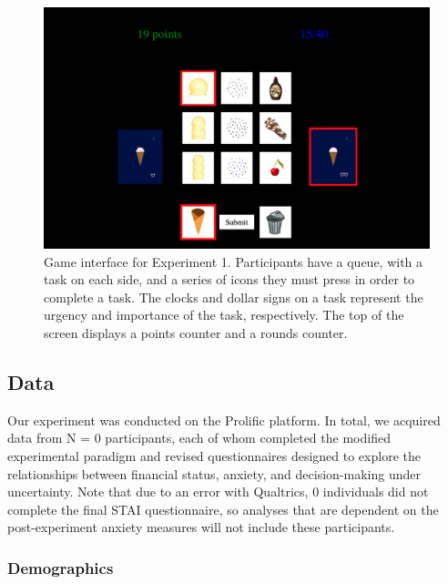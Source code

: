 \documentclass[
]{article}
\begin{document}
\begin{figure}

{\centering \includegraphics{images/exp_example.png}

}

\caption{\label{fig-exp}Game interface for Experiment 1. Participants
have a queue, with a task on each side, and a series of icons they must
press in order to complete a task. The clocks and dollar signs on a task
represent the urgency and importance of the task, respectively. The top
of the screen displays a points counter and a rounds counter.}

\end{figure}

\hypertarget{data-1}{%
\subsection{Data}\label{data-1}}

Our experiment was conducted on the Prolific platform. In total, we
acquired data from N = 0 participants, each of whom completed the
modified experimental paradigm and revised questionnaires designed to
explore the relationships between financial status, anxiety, and
decision-making under uncertainty. Note that due to an error with
Qualtrics, 0 individuals did not complete the final STAI questionnaire,
so analyses that are dependent on the post-experiment anxiety measures
will not include these participants.

\hypertarget{demographics-1}{%
\subsubsection{Demographics}\label{demographics-1}}
\end{document}
